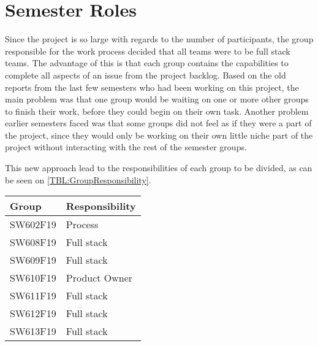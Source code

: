 \section{Semester Roles}
Since the project is so large with regards to the number of participants, the group responsible for the work process decided that all teams were to be full stack teams.
The advantage of this is that each group contains the capabilities to complete all aspects of an issue from the project backlog.
Based on the old reports from the last few semesters who had been working on this project, the main problem was that one group would be waiting on one or more other groups to finish their work, before they could begin on their own task.
Another problem earlier semesters faced was that some groups did not feel as if they were a part of the project, since they would only be working on their own little niche part of the project without interacting with the rest of the semester groups.

This new approach lead to the responsibilities of each group to be divided, as can be seen on \autoref{TBL:GroupResponsibility}.
\begin{table}[H]
\centering
\begin{tabular}{|l|l|}
\hline
\textbf{Group} & \textbf{Responsibility} \\ \hline
SW602F19       & Process                 \\ \hline
SW608F19       & Full stack              \\ \hline
SW609F19       & Full stack              \\ \hline
SW610F19       & Product Owner           \\ \hline
SW611F19       & Full stack              \\ \hline
SW612F19       & Full stack              \\ \hline
SW613F19       & Full stack              \\ \hline
\end{tabular}
\label{TBL:GroupResponsibility}
\end{table}
